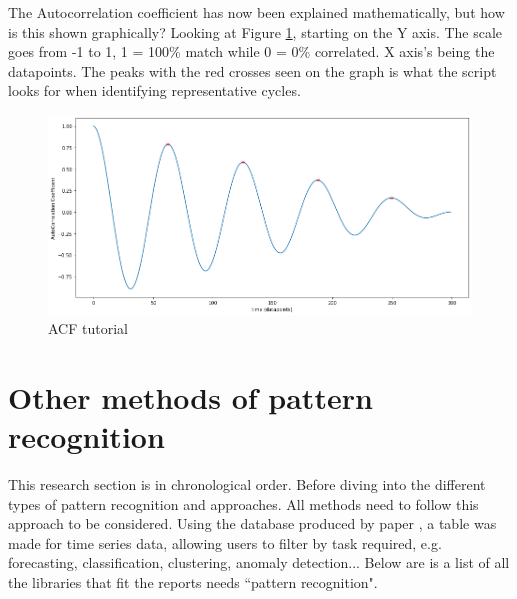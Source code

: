 The Autocorrelation coefficient has now been explained mathematically, but how is this shown graphically? 
Looking at Figure \ref{ACF coefficient}, starting on the Y axis. The scale goes from -1 to 1, 1 = 100\% match while 0 = 0\% correlated. X axis's being the datapoints. The peaks with the red crosses seen on the graph is what the script looks for when identifying representative cycles. 
\begin{figure}[h]
\centering
\includegraphics[scale=0.45]{images/ACF u DIAGRAM.png}
\caption{ACF tutorial}
\label{ACF coefficient}
\end{figure}

\section{Other methods of pattern recognition}
This research section is in chronological order. Before diving into the different types of pattern recognition and approaches. All methods need to follow this approach to be considered. Using the database produced by paper \cite{DBLP:journals/corr/abs-2104-07406}, a table was made for time series data, allowing users to filter by task required, e.g. forecasting, classification,	clustering,	anomaly detection... Below are is a list of all the libraries that fit the reports needs ``pattern recognition".



